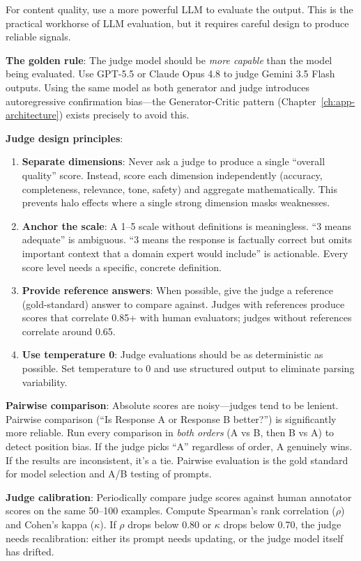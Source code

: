 For content quality, use a more powerful LLM to evaluate the output. This is the practical workhorse of LLM evaluation, but it requires careful design to produce reliable signals.

\textbf{The golden rule}: The judge model should be \emph{more capable} than the model being evaluated. Use GPT-5.5 or Claude Opus 4.8 to judge Gemini 3.5 Flash outputs. Using the same model as both generator and judge introduces autoregressive confirmation bias---the Generator-Critic pattern (Chapter~\ref{ch:app-architecture}) exists precisely to avoid this.

\textbf{Judge design principles}:

\begin{enumerate}[leftmargin=*]
    \item \textbf{Separate dimensions}: Never ask a judge to produce a single ``overall quality'' score. Instead, score each dimension independently (accuracy, completeness, relevance, tone, safety) and aggregate mathematically. This prevents halo effects where a single strong dimension masks weaknesses.
    \item \textbf{Anchor the scale}: A 1--5 scale without definitions is meaningless. ``3 means adequate'' is ambiguous. ``3 means the response is factually correct but omits important context that a domain expert would include'' is actionable. Every score level needs a specific, concrete definition.
    \item \textbf{Provide reference answers}: When possible, give the judge a reference (gold-standard) answer to compare against. Judges with references produce scores that correlate 0.85+ with human evaluators; judges without references correlate around 0.65.
    \item \textbf{Use temperature 0}: Judge evaluations should be as deterministic as possible. Set temperature to 0 and use structured output to eliminate parsing variability.
\end{enumerate}

\textbf{Pairwise comparison}: Absolute scores are noisy---judges tend to be lenient. Pairwise comparison (``Is Response A or Response B better?'') is significantly more reliable. Run every comparison in \emph{both orders} (A vs B, then B vs A) to detect position bias. If the judge picks ``A'' regardless of order, A genuinely wins. If the results are inconsistent, it's a tie. Pairwise evaluation is the gold standard for model selection and A/B testing of prompts.

\textbf{Judge calibration}: Periodically compare judge scores against human annotator scores on the same 50--100 examples. Compute Spearman's rank correlation ($\rho$) and Cohen's kappa ($\kappa$). If $\rho$ drops below 0.80 or $\kappa$ drops below 0.70, the judge needs recalibration: either its prompt needs updating, or the judge model itself has drifted.

